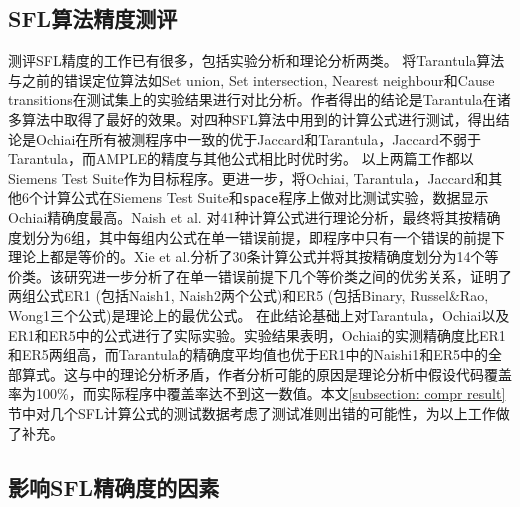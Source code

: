 \subsection{SFL算法精度测评}

测评SFL精度的工作已有很多，包括实验分析和理论分析两类。
\cite{Jones:2005:EET:1101908.1101949}将Tarantula算法与之前的错误定位算法如Set union, Set intersection, Nearest neighbour和Cause transitions在测试集上的实验结果进行对比分析。作者得出的结论是Tarantula在诸多算法中取得了最好的效果。\cite{4041886}对四种SFL算法中用到的计算公式进行测试，得出结论是Ochiai在所有被测程序中一致的优于Jaccard和Tarantula，Jaccard不弱于Tarantula，而AMPLE的精度与其他公式相比时优时劣。 以上两篇工作都以Siemens Test Suite作为目标程序。更进一步，\cite{Abreu20091780}将Ochiai, Tarantula，Jaccard和其他6个计算公式在Siemens Test Suite和\texttt{space}程序上做对比测试实验，数据显示Ochiai精确度最高。Naish et al. \cite{Naish:2011:MSS:2000791.2000795} 对41种计算公式进行理论分析，最终将其按精确度划分为6组，其中每组内公式在单一错误前提，即程序中只有一个错误的前提下理论上都是等价的。Xie et al.\cite{xie2013theoretical}分析了30条计算公式并将其按精确度划分为14个等价类。该研究进一步分析了在单一错误前提下几个等价类之间的优劣关系，证明了两组公式ER1 (包括Naish1, Naish2两个公式)和ER5 (包括Binary, Russel\&Rao, Wong1三个公式)是理论上的最优公式。
在此结论基础上\cite{6676912}对Tarantula，Ochiai以及ER1和ER5中的公式进行了实际实验。实验结果表明，Ochiai的实测精确度比ER1和ER5两组高，而Tarantula的精确度平均值也优于ER1中的Naishi1和ER5中的全部算式。这与\cite{xie2013theoretical}中的理论分析矛盾，作者分析可能的原因是理论分析中假设代码覆盖率为100\%，而实际程序中覆盖率达不到这一数值。本文\ref{subsection: compr result}节中对几个SFL计算公式的测试数据考虑了测试准则出错的可能性，为以上工作做了补充。
\subsection{影响SFL精确度的因素}

